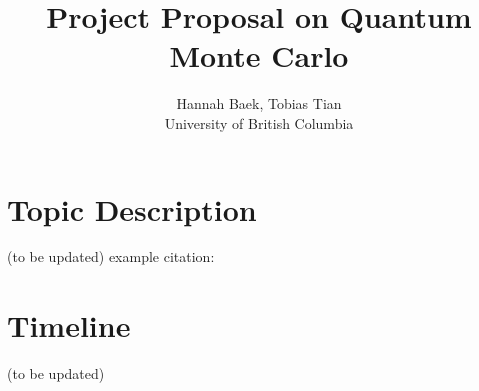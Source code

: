 \documentclass[11pt]{article}
\begin{document}
\title{Project Proposal on Quantum Monte Carlo}

\author{Hannah Baek, Tobias Tian \\
University of British Columbia}

\date{\vspace{-2.5ex}}
\maketitle


\section{Topic Description}
(to be updated)
example citation: \cite{shor_97}

\section{Timeline}
(to be updated)





\end{document}
